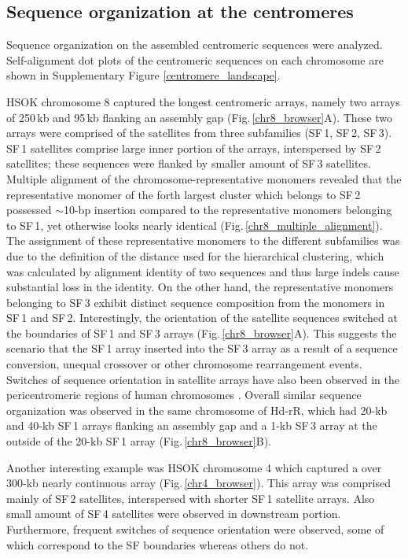 \subsection*{Sequence organization at the centromeres}
  Sequence organization on the assembled centromeric sequences were analyzed. Self-alignment dot plots of the centromeric sequences on each chromosome are shown in Supplementary Figure \ref{centromere_landscape}.

  HSOK chromosome 8 captured the longest centromeric arrays, namely two arrays of 250\,kb and 95\,kb flanking an assembly gap (Fig.\,\ref{chr8_browser}A). These two arrays were comprised of the satellites from three subfamilies (SF\,1, SF\,2, SF\,3). SF\,1 satellites comprise large inner portion of the arrays, interspersed by SF\,2 satellites; these sequences were flanked by smaller amount of SF\,3 satellites. Multiple alignment of the chromosome-representative monomers revealed that the representative monomer of the forth largest cluster which belongs to SF\,2 possessed $\sim$10-bp insertion compared to the representative monomers belonging to SF\,1, yet otherwise looks nearly identical (Fig.\,\ref{chr8_multiple_alignment}). The assignment of these representative monomers to the different subfamilies was due to the definition of the distance used for the hierarchical clustering, which was calculated by alignment identity of two sequences and thus large indels cause substantial loss in the identity. On the other hand, the representative monomers belonging to SF\,3 exhibit distinct sequence composition from the monomers in SF\,1 and SF\,2. Interestingly, the orientation of the satellite sequences switched at the boundaries of SF\,1 and SF\,3 arrays (Fig.\,\ref{chr8_browser}A). This suggests the scenario that the SF\,1 array inserted into the SF\,3 array as a result of a sequence conversion, unequal crossover or other chromosome rearrangement events. Switches of sequence orientation in satellite arrays have also been observed in the pericentromeric regions of human chromosomes \cite{M.KatharineRuddand2004}. Overall similar sequence organization was observed in the same chromosome of Hd-rR, which had 20-kb and 40-kb SF\,1 arrays flanking an assembly gap and a 1-kb SF\,3 array at the outside of the 20-kb SF\,1 array (Fig.\,\ref{chr8_browser}B).

  Another interesting example was HSOK chromosome 4 which captured a over 300-kb nearly continuous array (Fig.\,\ref{chr4_browser}). This array was comprised mainly of SF\,2 satellites, interspersed with shorter SF\,1 satellite arrays. Also small amount of SF\,4 satellites were observed in downstream portion. Furthermore, frequent switches of sequence orientation were observed, some of which correspond to the SF boundaries whereas others do not.

